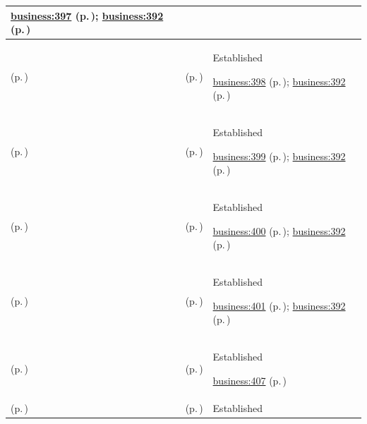 \begin{longtable}{|>{\raggedright\arraybackslash}p{0.27\TableWidth}|>{\raggedright\arraybackslash}p{0.27\TableWidth}|>{\raggedright\arraybackslash}p{0.46\TableWidth}|}
 \hyperref[rad:business:394]{business:397} (p.\,\pageref{rad:business:394}); \hyperref[rad:business:392]{business:392} (p.\,\pageref{rad:business:392})\\\hline
\nameref{cap:bc-care-scheduling-capacity-management} (p.\,\pageref{cap:bc-care-scheduling-capacity-management}) & \nameref{cap:bc-care-place-readiness-management} (p.\,\pageref{cap:bc-care-place-readiness-management}) & Established

 \hyperref[rad:business:394]{business:398} (p.\,\pageref{rad:business:394}); \hyperref[rad:business:392]{business:392} (p.\,\pageref{rad:business:392})\\\hline
\nameref{cap:bc-care-scheduling-capacity-management} (p.\,\pageref{cap:bc-care-scheduling-capacity-management}) & \nameref{cap:bc-care-resource-deployment} (p.\,\pageref{cap:bc-care-resource-deployment}) & Established

 \hyperref[rad:business:394]{business:399} (p.\,\pageref{rad:business:394}); \hyperref[rad:business:392]{business:392} (p.\,\pageref{rad:business:392})\\\hline
\nameref{cap:bc-care-scheduling-capacity-management} (p.\,\pageref{cap:bc-care-scheduling-capacity-management}) & \nameref{cap:bc-operational-care-flow-coordination} (p.\,\pageref{cap:bc-operational-care-flow-coordination}) & Established

 \hyperref[rad:business:394]{business:400} (p.\,\pageref{rad:business:394}); \hyperref[rad:business:392]{business:392} (p.\,\pageref{rad:business:392})\\\hline
\nameref{cap:bc-care-scheduling-capacity-management} (p.\,\pageref{cap:bc-care-scheduling-capacity-management}) & \nameref{cap:bc-operational-care-capacity-management} (p.\,\pageref{cap:bc-operational-care-capacity-management}) & Established

 \hyperref[rad:business:394]{business:401} (p.\,\pageref{rad:business:394}); \hyperref[rad:business:392]{business:392} (p.\,\pageref{rad:business:392})\\\hline
\nameref{cap:bc-care-access-coordination} (p.\,\pageref{cap:bc-care-access-coordination}) & \nameref{cap:bc-care-coordination-transition} (p.\,\pageref{cap:bc-care-coordination-transition}) & Established

 \hyperref[rad:business:407]{business:407} (p.\,\pageref{rad:business:407})\\\hline
\nameref{cap:bc-care-coordination-transition} (p.\,\pageref{cap:bc-care-coordination-transition}) & \nameref{cap:bc-care-team-coordination} (p.\,\pageref{cap:bc-care-team-coordination}) & Established


\end{longtable}
